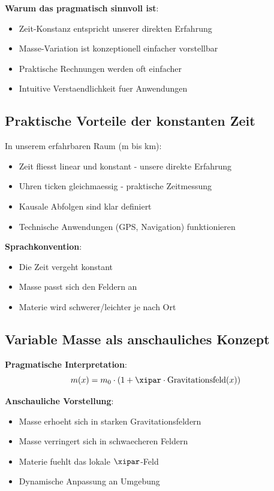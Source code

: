 	\textbf{Warum das pragmatisch sinnvoll ist}:
	\begin{itemize}
		\item Zeit-Konstanz entspricht unserer direkten Erfahrung
		\item Masse-Variation ist konzeptionell einfacher vorstellbar
		\item Praktische Rechnungen werden oft einfacher
		\item Intuitive Verstaendlichkeit fuer Anwendungen
	\end{itemize}
	
	\subsection{Praktische Vorteile der konstanten Zeit}
	
	In unserem erfahrbaren Raum (m bis km):
	\begin{itemize}
		\item Zeit fliesst linear und konstant - unsere direkte Erfahrung
		\item Uhren ticken gleichmaessig - praktische Zeitmessung
		\item Kausale Abfolgen sind klar definiert
		\item Technische Anwendungen (GPS, Navigation) funktionieren
	\end{itemize}
	
	\textbf{Sprachkonvention}:
	\begin{itemize}
		\item Die Zeit vergeht konstant
		\item Masse passt sich den Feldern an
		\item Materie wird schwerer/leichter je nach Ort
	\end{itemize}
	
	\subsection{Variable Masse als anschauliches Konzept}
	
	\textbf{Pragmatische Interpretation}:
	\begin{equation}
		m(x) = m_0 \cdot (1 + \xipar \cdot \text{Gravitationsfeld}(x))
	\end{equation}
	
	\textbf{Anschauliche Vorstellung}:
	\begin{itemize}
		\item Masse erhoeht sich in starken Gravitationsfeldern
		\item Masse verringert sich in schwaecheren Feldern
		\item Materie fuehlt das lokale $\xipar$-Feld
		\item Dynamische Anpassung an Umgebung
	\end{itemize}
	
